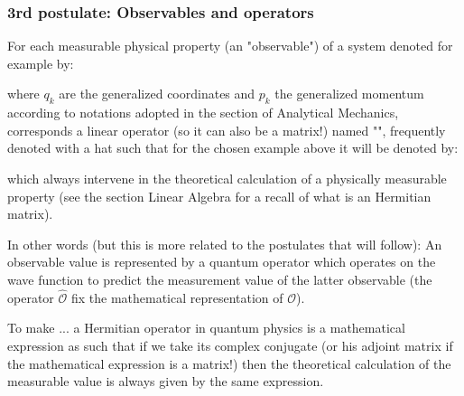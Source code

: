 	\subsubsection{3rd postulate: Observables and operators}\label{observables and operators}
	For each measurable physical property (an "observable") of a system denoted for example by:
	
	where $q_k$ are the generalized coordinates and $p_k$ the generalized momentum according to notations adopted in the section of Analytical Mechanics, corresponds a linear operator (so it can also be a matrix!) named "\label{hermitian operator}", frequently denoted with a hat such that for the chosen example above it will be denoted by:
	
	which always intervene in the theoretical calculation of a physically measurable property (see the section Linear Algebra for a recall of what is an Hermitian matrix).
	
	In other words (but this is more related to the postulates that will follow): An observable value is represented by a quantum operator which operates on the wave function to predict the measurement value of the latter observable (the operator $\hat{\mathcal{O}}$ fix the mathematical representation of $\mathcal{O}$).
	
	To make ... a Hermitian operator in quantum physics is a mathematical expression as such that if we take its complex conjugate (or his adjoint matrix if the mathematical expression is a matrix!) then the theoretical calculation of the measurable value is always given by the same expression.
	
